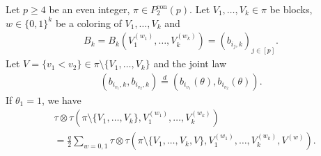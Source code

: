 \documentclass[10pt,a4paper]{amsart}
\begin{document}
\begin{lemma}[Case $\theta_1=1$]\label{lemma: case theta_1=1}
    Let $p \ge 4$ be an even integer, $\pi \in P_2^{\operatorname{con}}(p)$. Let $V_1,\ldots,V_k \in \pi$ be blocks, $w \in \{0,1\}^k$ be a coloring of $V_1,\ldots,V_k$ and
    \begin{align*}
        B_k=B_k\left(V_1^{(w_1)},\ldots,V_k^{(w_k)}\right)=\left(b_{i_j,k}\right)_{j \in [p]}.
    \end{align*}
    Let $V=\{v_1<v_2\} \in \pi\setminus \{V_1,\ldots,V_{k}\}$ and the joint law 
    \begin{align*}
        \left(b_{i_{v_1},k},b_{i_{v_2},k}\right)\overset{d}{=}\left(b_{i_{v_1}}(\theta),b_{i_{v_2}}(\theta)\right).
    \end{align*}
    If $\theta_1=1$, we have
    \begin{align*}
        &\tau\otimes\tau \left(\pi\setminus \{V_1,\ldots,V_{k}\},V_1^{(w_1)},\ldots,V_{k}^{(w_{k})}\right)\\
        &=\frac{q}{2}\sum_{w=0,1}\tau\otimes\tau \left(\pi\setminus \{V_1,\ldots,V_k,V\},V_1^{(w_1)},\ldots,V_{k}^{(w_{k})},V^{(w)}\right).
    \end{align*}
\end{lemma}
\end{document}
